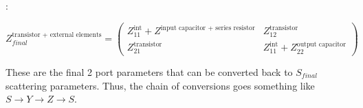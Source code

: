 :

\[ 
    Z_{final}^{\text{transistor + external elements}} = \begin{pmatrix}
        Z_{11}^{\text{int}} + Z^{\text{input capacitor + series resistor}} &
        Z_{12}^{\text{transistor}} \\
        Z_{21}^{\text{transistor}} & Z_{11}^{\text{int}} +
        Z_{22}^{\text{output capacitor}}
    \end{pmatrix} 
\]

These are the final 2 port parameters that can be converted back to $S_{final}$
scattering parameters. Thus, the chain of conversions goes something like $S
\rightarrow Y \rightarrow Z \rightarrow S$.

 

 




